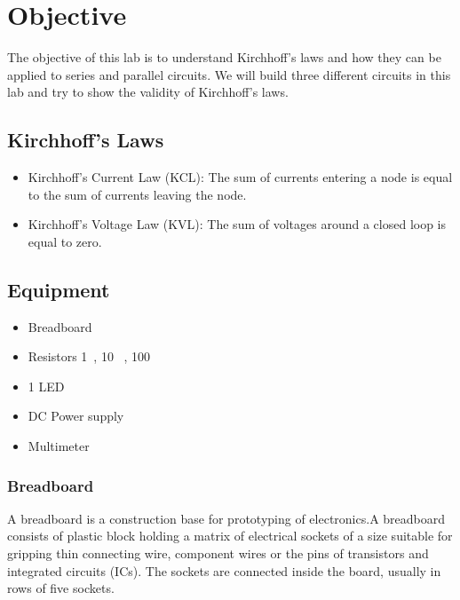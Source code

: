 \documentclass[a4paper, 10pt]{article}
\begin{document}
	\tableofcontents
	\pagebreak
	
	\listoffigures
	\pagebreak

	\listoftables	
	\pagebreak 

	\section{Objective}
		The objective of this lab is to understand Kirchhoff's laws and how they can be applied to series and parallel circuits.
		We will build three different circuits in this lab and try to show the validity of Kirchhoff's laws.
		
		\subsection{Kirchhoff's Laws}
			\begin{itemize}
				\item Kirchhoff's Current Law (KCL): The sum of currents entering a node is equal to the sum of currents leaving the node.
				\item Kirchhoff's Voltage Law (KVL): The sum of voltages around a closed loop is equal to zero.
			\end{itemize}
	
		\subsection{Equipment}
			\begin{itemize}
				\item Breadboard
				\item Resistors 1\si{\kilo\Omega}, 10 \si{\kilo\Omega}, 100 \si{\Omega}
				\item 1 LED
				\item DC Power supply
				\item Multimeter
			\end{itemize}

			\subsubsection{Breadboard}
				A breadboard is a construction base for prototyping of electronics.A breadboard consists of plastic block holding a matrix of electrical sockets of a size suitable for gripping thin connecting wire, 
				component wires or the pins of transistors and integrated circuits (ICs). The sockets are connected inside the board, usually in rows of five sockets.
\end{document}
